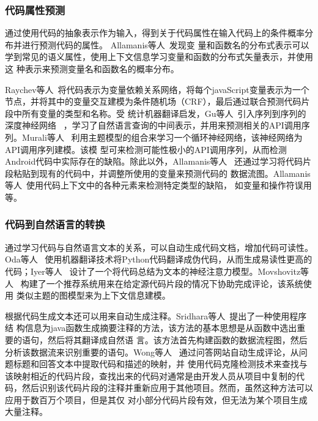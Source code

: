 \subsubsection{代码属性预测}
通过使用代码的抽象表示作为输入，得到关于代码属性在输入代码上的条件概率分布并进行预测代码的属性。
Allamanis等人~\cite{allamanis2014learning,allamanis2015suggesting,allamanis2016convolutional}发现变
量和函数名的分布式表示可以学到常见的语义属性，使用上下文信息学习变量和函数的分布式矢量表示，并使用这
种表示来预测变量名和函数名的概率分布。

Raychev等人~\cite{raychev2015predicting}将代码表示为变量依赖关系网络，将每个javaScript变量表示为一个
节点，并将其中的变量交互建模为条件随机场（CRF），最后通过联合预测代码片段中所有变量的类型和名称。受
统计机器翻译启发，Gu等人~\cite{gu2016deep}引入序列到序列的深度神经网络
~\cite{sutskever2014sequence}，学习了自然语言查询的中间表示，并用来预测相关的API调用序列。Murali等人
~\cite{murali2017finding}利用主题模型的组合来学习一个循环神经网络，该神经网络为API调用序列建模。该模
型可来检测可能性极小的API调用序列，从而检测Android代码中实际存在的缺陷。除此以外，Allamanis等人
~\cite{allamanis2018learning}还通过学习将代码片段粘贴到现有的代码中，并调整所使用的变量来预测代码的
数据流图。Allamanis等人~\cite{allamanis2018learning}使用代码上下文中的各种元素来检测特定类型的缺陷，
如变量和操作符误用等。

\subsubsection{代码到自然语言的转换}
通过学习代码与自然语言文本的关系，可以自动生成代码文档，增加代码可读性。Oda等人
~\cite{oda2015learning}使用机器翻译技术将Python代码翻译成伪代码，从而生成易读性更高的代码；Iyer等人
~\cite{iyer2016summarizing}设计了一个将代码总结为文本的神经注意力模型。Movshovitz等人
~\cite{movshovitz2013natural}构建了一个推荐系统用来在给定源代码片段的情况下协助完成评论，该系统使用
类似主题的图模型来为上下文信息建模。

根据代码生成文本还可以用来自动生成注释。Sridhara等人~\cite{sridhara2010towards}提出了一种使用程序结
构信息为java函数生成摘要注释的方法，该方法的基本思想是从函数中选出重要的语句，然后将其翻译成自然语
言。该方法首先构建函数的数据流程图，然后分析该数据流来识别重要的语句。Wong等人
~\cite{wong2013autocomment}通过问答网站自动生成评论，从问题标题和回答文本中提取代码和描述的映射，并
使用代码克隆检测技术来查找与该映射相近的代码片段，查找出来的代码对通常是由开发人员从项目中复制的代
码，然后识别该代码片段的注释并重新应用于其他项目。然而，虽然这种方法可以应用于数百万个项目，但是其仅
对小部分代码片段有效，但无法为某个项目生成大量注释。

